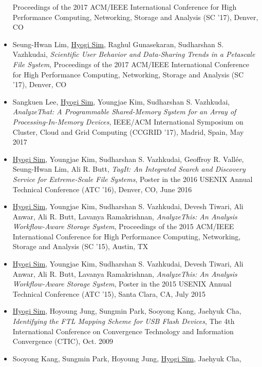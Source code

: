\begin{itemize}
        Proceedings of the 2017 ACM/IEEE International Conference for High
        Performance Computing, Networking, Storage and Analysis (SC '17), Denver, CO
    \item Seung-Hwan Lim, \underline{Hyogi Sim}, Raghul Gunasekaran,
        Sudharshan S. Vazhkudai,
        {\it Scientific User Behavior and Data-Sharing Trends in a Petascale File System},
        Proceedings of the 2017 ACM/IEEE International Conference for High
        Performance Computing, Networking, Storage and Analysis (SC '17), Denver, CO
    \item Sangkuen Lee, \underline{Hyogi Sim}, Youngjae Kim,
        Sudharshan S. Vazhkudai,
        {\it AnalyzeThat: A Programmable Shared-Memory System for an Array of Processing-In-Memory Devices},
        IEEE/ACM International Symposium on Cluster, Cloud and Grid Computing
        (CCGRID '17), Madrid, Spain, May 2017
    \item \underline{Hyogi Sim}, Youngjae Kim, Sudharshan S. Vazhkudai,
        Geoffroy R. Vall\'ee, Seung-Hwan Lim, Ali R. Butt,
        {\it TagIt: An Integrated Search and Discovery Service for Extreme-Scale File
        Systems},
        Poster in the 2016 USENIX Annual Technical Conference (ATC '16),
        Denver, CO, June 2016 %
    \item \underline{Hyogi Sim}, Youngjae Kim, Sudharshan S. Vazhkudai,
        Devesh Tiwari, Ali Anwar, Ali R. Butt, Lavanya Ramakrishnan,
        {\it AnalyzeThis: An Analysis Workflow-Aware Storage System},
        Proceedings of the 2015 ACM/IEEE International Conference for High
        Performance Computing, Networking, Storage and Analysis (SC '15), Austin, TX
    \item \underline{Hyogi Sim}, Youngjae Kim, Sudharshan S. Vazhkudai,
        Devesh Tiwari, Ali Anwar, Ali R. Butt, Lavanya Ramakrishnan,
        {\it AnalyzeThis: An Analysis Workflow-Aware Storage System},
        Poster in the 2015 USENIX Annual Technical Conference (ATC '15),
        Santa Clara, CA, July 2015
    \item \underline{Hyogi Sim}, Hoyoung Jung, Sungmin Park, Sooyong Kang, Jaehyuk Cha,
        {\it Identifying the FTL Mapping Scheme for USB Flash Devices},
        The 4th International Conference on Convergence Technology
        and Information Convergence (CTIC), Oct. 2009 %
    \item Sooyong Kang, Sungmin Park, Hoyoung Jung, \underline{Hyogi Sim}, Jaehyuk Cha,

\end{itemize}
